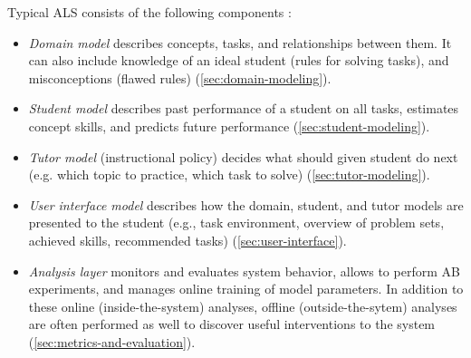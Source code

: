 \smallskip
Typical ALS consists of the following components
\cite{its-learner-models}:
\begin{itemize}
\item \emph{Domain model}
  describes concepts, tasks, and relationships between them.
  It can also include knowledge of an ideal student (rules for solving tasks),
  and misconceptions (flawed rules)
  (\cref{sec:domain-modeling}).
\item \emph{Student model} %
  describes past performance of a student on all tasks,
  estimates concept skills,
  and predicts future performance
  (\cref{sec:student-modeling}).
\item \emph{Tutor model}
  (instructional policy)
  decides what should given student do next
  (e.g. which topic to practice, which task to solve)
  (\cref{sec:tutor-modeling}).
\item \emph{User interface model} %
  describes how the domain, student, and tutor models are presented to
  the student (e.g., task environment, overview of problem sets, achieved
  skills, recommended tasks)
  (\cref{sec:user-interface}).
\item \emph{Analysis layer}
  monitors and evaluates system behavior,
  allows to perform AB experiments,
  and manages online training of model parameters.
  In addition to these online (inside-the-system) analyses,
  offline (outside-the-sytem) analyses are often performed as well
  to discover useful interventions to the system  %
  (\cref{sec:metrics-and-evaluation}).
\end{itemize}



